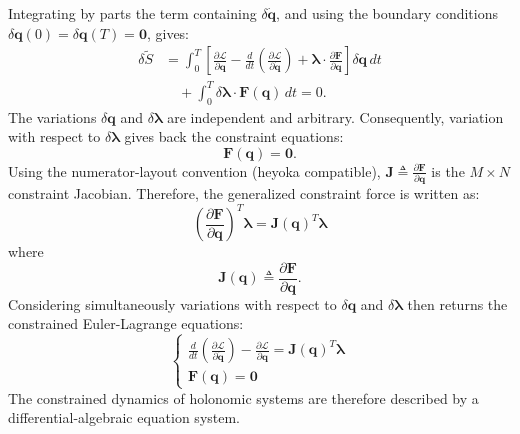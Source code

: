 \documentclass{article}
\begin{document}
Integrating by parts the term containing $\delta\dot{\bm q}$, and using the boundary conditions $\delta\bm q(0)=\delta\bm q(T)=\bm 0$, gives:
$$
\begin{aligned}
\delta\widetilde{S}
&=
\int_0^T
\left[
\frac{\partial\mathcal L}{\partial\bm q}
-
\frac{d}{dt}
\left(
\frac{\partial\mathcal L}{\partial\dot{\bm q}}
\right)
+
\bm\lambda\cdot
\frac{\partial\bm F}{\partial\bm q}
\right]\delta\bm q\,dt
\\
&\quad
+
\int_0^T
\delta\bm\lambda\cdot\bm F(\bm q)\,dt
=0.
\end{aligned}
$$
The variations $\delta\bm q$ and $\delta\bm\lambda$ are independent and arbitrary. Consequently, variation with respect to $\delta\bm\lambda$ gives back the constraint equations:
$$
\bm F(\bm q)=\bm 0.
$$
Using the numerator-layout convention (heyoka compatible),
$\bm J \triangleq \frac{\partial\bm F}{\partial\bm q}$ is the $M\times N$ constraint Jacobian. Therefore, the generalized constraint force is written as:
$$
\left(\frac{\partial\bm F}{\partial\bm q}\right)^T \bm\lambda
=
\bm J(\bm q)^T\bm\lambda
$$
where
$$
\bm J(\bm q)
\triangleq
\frac{\partial\bm F}{\partial\bm q}.
$$
Considering simultaneously variations with respect to $\delta\bm q$ and $\delta \bm \lambda$ then returns the constrained Euler-Lagrange equations:
\begin{equation}
\boxed{
\left\{
\begin{array}{l}
\displaystyle
\frac{d}{dt}
\left(
\frac{\partial\mathcal L}{\partial\dot{\bm q}}
\right)
-
\frac{\partial\mathcal L}{\partial\bm q}
=
\bm J(\bm q)^T\bm\lambda
\\[1.2em]
\bm F(\bm q)=\bm 0
\end{array}
\right.
}
\end{equation}
The constrained dynamics of holonomic systems are therefore described by a differential-algebraic equation system.
\end{document}
